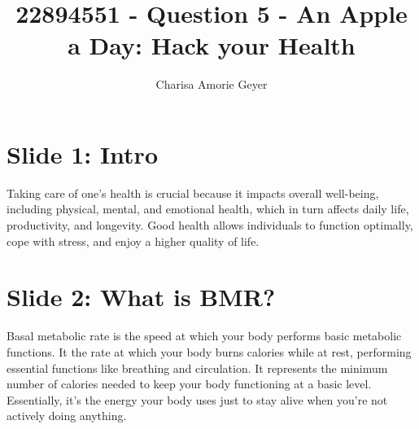 \documentclass[11pt,preprint]{elsarticle}
\numberwithin{equation}{section}
\numberwithin{figure}{section}
\numberwithin{table}{section}
\begin{document}
\begin{frontmatter}  %

\title{22894551 - Question 5 - An Apple a Day: Hack your Health}





\author[Add1]{Charisa Amorie Geyer}





\address[Add1]{Stellenbosch University, Cape Town, South Africa}



\vspace{1cm}





\vspace{0.5cm}

\end{frontmatter}

\setcounter{footnote}{0}



\pagestyle{fancy}
\chead{}
\rhead{}
\lfoot{}
\lhead{}
\cfoot{}


\headsep 35pt %




\section{Slide 1: Intro}\label{slide-1-intro}

Taking care of one's health is crucial because it impacts overall
well-being, including physical, mental, and emotional health, which in
turn affects daily life, productivity, and longevity. Good health allows
individuals to function optimally, cope with stress, and enjoy a higher
quality of life.

\section{Slide 2: What is BMR?}\label{slide-2-what-is-bmr}

Basal metabolic rate is the speed at which your body performs basic
metabolic functions. It the rate at which your body burns calories while
at rest, performing essential functions like breathing and circulation.
It represents the minimum number of calories needed to keep your body
functioning at a basic level. Essentially, it's the energy your body
uses just to stay alive when you're not actively doing anything.
\end{document}
